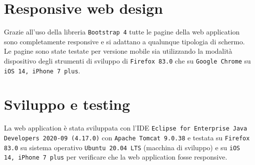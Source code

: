 \documentclass{article}
\begin{document}
\section{Responsive web design}
Grazie all'uso della libreria \texttt{Bootstrap 4} tutte le pagine della web application sono completamente responsive e si adattano a qualunque tipologia di schermo. Le pagine sono state testate per versione mobile sia utilizzando la modalità dispositivo degli strumenti di sviluppo di \texttt{Firefox 83.0} che su \texttt{Google Chrome} su \texttt{iOS 14, iPhone 7 plus}.
\section{Sviluppo e testing}
La web application è stata sviluppata con l'IDE \texttt{Eclipse for Enterprise Java Developers 2020-09 (4.17.0)} con \texttt{Apache Tomcat 9.0.38} e testata su \texttt{Firefox 83.0} su sistema operativo \texttt{Ubuntu 20.04 LTS} (macchina di sviluppo) e su \texttt{iOS 14, iPhone 7 plus} per verificare che la web application fosse responsive.
\end{document}
